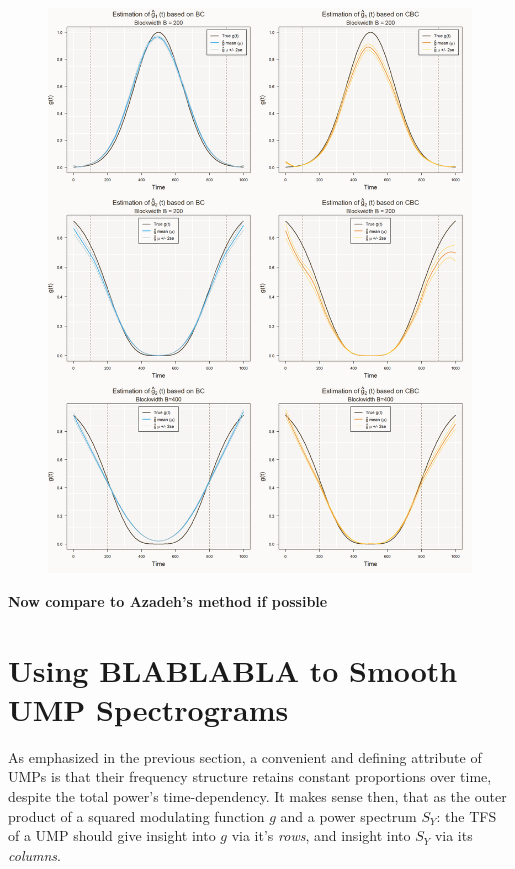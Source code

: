 \documentclass{article}
\begin{document}
\begin{figure}
    \centering
    \includegraphics[width=\linewidth]{Fig/gest_UMP_B200_B400.png}
    \caption{}
    \label{fig:enter-label}
\end{figure}


\textbf{Now compare to Azadeh's method if possible}

\section{Using BLABLABLA to Smooth UMP Spectrograms}

As emphasized in the previous section, a convenient and defining attribute of UMPs is that their frequency structure retains constant proportions over time, despite the total power's time-dependency. It makes sense then, that as the outer product of a squared modulating function $g$ and a power spectrum $S_Y$: the TFS of a UMP should give insight into $g$ via it's \textit{rows}, and insight into $S_Y$ via its \textit{columns}.
\end{document}
